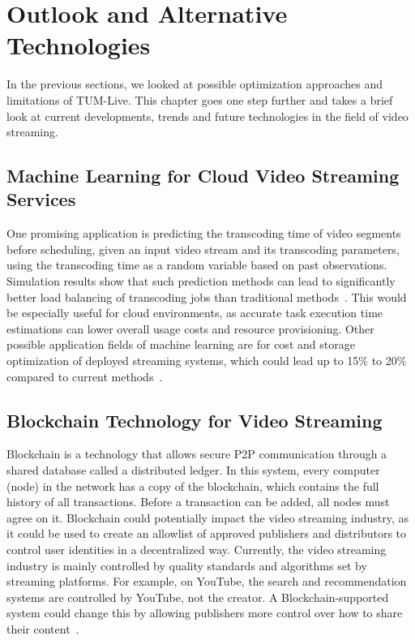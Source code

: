 
\chapter{Outlook and Alternative Technologies}\label{chapter:outlook}

In the previous sections, we looked at possible optimization approaches and limitations of TUM-Live. This chapter goes one step further and takes a brief look at current developments, trends and future technologies in the field of video streaming.

\section{Machine Learning for Cloud Video Streaming Services}

One promising application is predicting the transcoding time of video segments before scheduling, given an input video stream and its transcoding parameters, using the transcoding time as a random variable based on past observations. Simulation results show that such prediction methods can lead to significantly better load balancing of transcoding jobs than traditional methods~\parencite{cloud_predicting}.
This would be especially useful for cloud environments, as accurate task execution time estimations can lower overall usage costs and resource provisioning. Other possible application fields of machine learning are for cost and storage optimization of deployed streaming systems, which could lead up to 15\% to 20\% compared to current methods~\parencite{deep_learning_cloud}.

\section{Blockchain Technology for Video Streaming}

Blockchain is a technology that allows secure \ac{P2P} communication through a shared database called a distributed ledger. In this system, every computer (node) in the network has a copy of the blockchain, which contains the full history of all transactions. Before a transaction can be added, all nodes must agree on it.
Blockchain could potentially impact the video streaming industry, as it could be used to create an allowlist of approved publishers and distributors to control user identities in a decentralized way.
Currently, the video streaming industry is mainly controlled by quality standards and algorithms set by streaming platforms. For example, on YouTube, the search and recommendation systems are controlled by YouTube, not the creator. A Blockchain-supported system could change this by allowing publishers more control over how to share their content~\parencite{cloud_streaming}.

